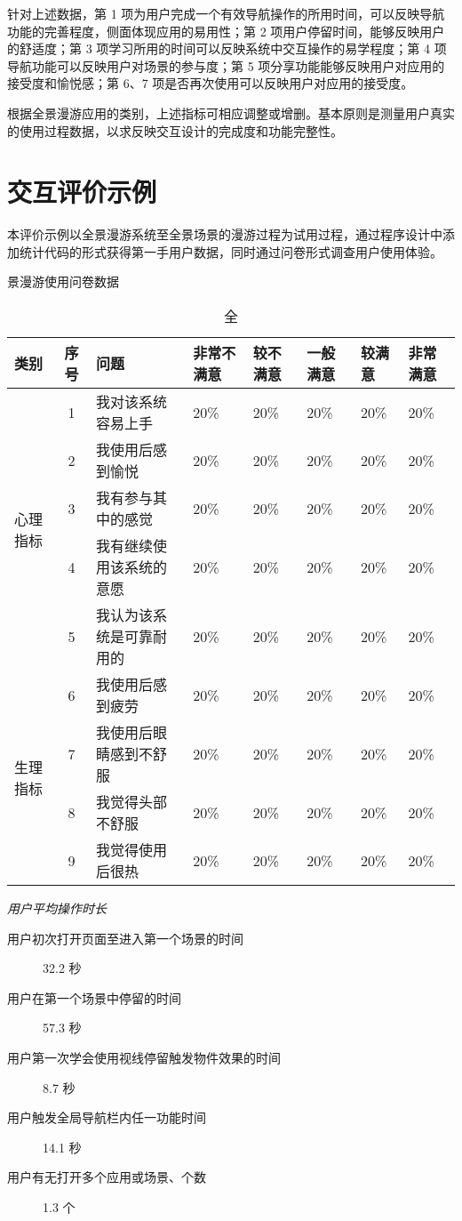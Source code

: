 针对上述数据，第 1 项为用户完成一个有效导航操作的所用时间，可以反映导航功能的完善程度，侧面体现应用的易用性；第 2 项用户停留时间，能够反映用户的舒适度；第 3 项学习所用的时间可以反映系统中交互操作的易学程度；第 4 项导航功能可以反映用户对场景的参与度；第 5 项分享功能能够反映用户对应用的接受度和愉悦感；第 6、7 项是否再次使用可以反映用户对应用的接受度。

根据全景漫游应用的类别，上述指标可相应调整或增删。基本原则是测量用户真实的使用过程数据，以求反映交互设计的完成度和功能完整性。


\section{交互评价示例}

本评价示例以全景漫游系统至全景场景的漫游过程为试用过程，通过程序设计中添加统计代码的形式获得第一手用户数据，同时通过问卷形式调查用户使用体验。

\begin{table}[htp]
\centering
\caption 全景漫游使用问卷数据
\vskip 5pt
\begin{tabular}{lcllllll}
\toprule
类别 & 序号 & 问题 
& 非常不满意 & 较不满意 & 一般满意 & 较满意 & 非常满意 \\
\midrule
\multirow{5}{*}{心理指标} & 1 & 我对该系统容易上手
& 20\% & 20\% & 20\% & 20\% & 20\% \\
& 2 & 我使用后感到愉悦
& 20\% & 20\% & 20\% & 20\% & 20\% \\
& 3 & 我有参与其中的感觉
& 20\% & 20\% & 20\% & 20\% & 20\% \\
& 4 & 我有继续使用该系统的意愿
& 20\% & 20\% & 20\% & 20\% & 20\% \\
& 5 & 我认为该系统是可靠耐用的
& 20\% & 20\% & 20\% & 20\% & 20\% \\
\midrule
\multirow{4}{*}{生理指标} & 6 & 我使用后感到疲劳
& 20\% & 20\% & 20\% & 20\% & 20\% \\
& 7 & 我使用后眼睛感到不舒服
& 20\% & 20\% & 20\% & 20\% & 20\% \\
& 8 & 我觉得头部不舒服
& 20\% & 20\% & 20\% & 20\% & 20\% \\
& 9 & 我觉得使用后很热
& 20\% & 20\% & 20\% & 20\% & 20\% \\
\bottomrule
\end{tabular}
\label{tab:result}
\end{table}

\emph{用户平均操作时长}
\begin{description}
	\item [用户初次打开页面至进入第一个场景的时间] 32.2 秒
	\item [用户在第一个场景中停留的时间] 57.3 秒
	\item [用户第一次学会使用视线停留触发物件效果的时间] 8.7 秒
	\item [用户触发全局导航栏内任一功能时间] 14.1 秒
    \item [用户有无打开多个应用或场景、个数] 1.3 个
\end{description}

